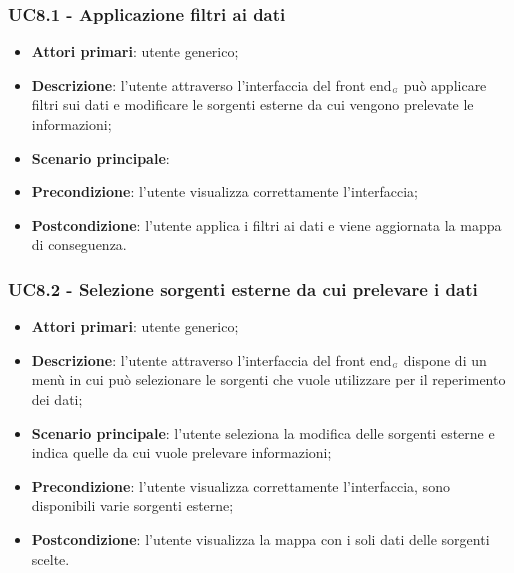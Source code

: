 \subsubsection{UC8.1 - Applicazione filtri ai dati}\label{applicazioneFiltri}
\begin{itemize}
	\item \textbf{Attori primari}: utente generico;
	\item \textbf{Descrizione}: l'utente attraverso l'interfaccia del front end$_{\scaleto{G}{3pt}}$ può applicare filtri sui dati e modificare le sorgenti esterne da cui vengono prelevate le informazioni;
	\item \textbf{Scenario principale}: 
	\item \textbf{Precondizione}: l'utente visualizza correttamente l'interfaccia;
	\item \textbf{Postcondizione}: l'utente applica i filtri ai dati e viene aggiornata la mappa di conseguenza. 
\end{itemize}

\subsubsection{UC8.2 - Selezione sorgenti esterne da cui prelevare i dati}\label{selezioneSorgenti}
\begin{itemize}
	\item \textbf{Attori primari}: utente generico;
	\item \textbf{Descrizione}: l'utente attraverso l'interfaccia del front end$_{\scaleto{G}{3pt}}$ dispone di un menù in cui può selezionare le sorgenti che vuole utilizzare per il reperimento dei dati;
	\item \textbf{Scenario principale}: l'utente seleziona la modifica delle sorgenti esterne e indica quelle da cui vuole prelevare informazioni;
	\item \textbf{Precondizione}: l'utente visualizza correttamente l'interfaccia, sono disponibili varie sorgenti esterne;
	\item \textbf{Postcondizione}: l'utente visualizza la mappa con i soli dati delle sorgenti scelte. 
\end{itemize}


